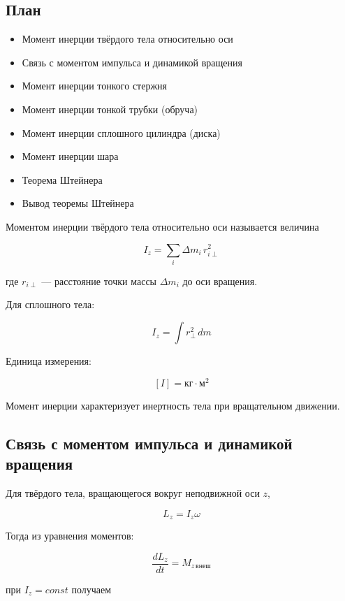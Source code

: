 \documentclass[a4paper,12pt]{article}
\begin{document}
\subsection*{План}
\begin{itemize}
\item Момент инерции твёрдого тела относительно оси
\item Связь с моментом импульса и динамикой вращения
\item Момент инерции тонкого стержня
\item Момент инерции тонкой трубки (обруча)
\item Момент инерции сплошного цилиндра (диска)
\item Момент инерции шара
\item Теорема Штейнера
\item Вывод теоремы Штейнера
\end{itemize}

\vspace{0.8em}

\begin{definitionbox}
Моментом инерции твёрдого тела относительно оси называется величина
\end{definitionbox}

\[
I_z = \sum_i \Delta m_i \, r_{i\perp}^2
\]

где $r_{i\perp}$ — расстояние точки массы $\Delta m_i$ до оси вращения.

Для сплошного тела:

\[
I_z = \int r_{\perp}^2 \, dm
\]

Единица измерения:

\[
[I] = \text{кг} \cdot \text{м}^2
\]

Момент инерции характеризует инертность тела при вращательном движении.

\vspace{0.8em}

\subsection*{Связь с моментом импульса и динамикой вращения}

Для твёрдого тела, вращающегося вокруг неподвижной оси $z$,

\[
L_z = I_z \omega
\]

Тогда из уравнения моментов:

\[
\frac{dL_z}{dt} = M_{z\,\text{внеш}}
\]

при $I_z = const$ получаем
\end{document}
